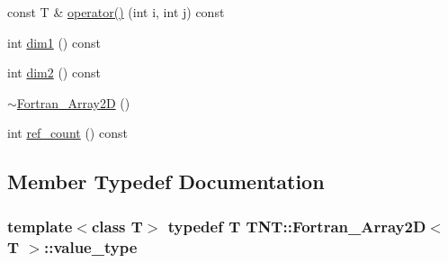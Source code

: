 \begin{DoxyCompactItemize}
const T \& \hyperlink{classTNT_1_1Fortran__Array2D_a96a4dc4f34fc0110b174c440920d454a}{operator()} (int i, int j) const 
\item 
int \hyperlink{classTNT_1_1Fortran__Array2D_aaf13a68efc992804b370571c06c2e96a}{dim1} () const 
\item 
int \hyperlink{classTNT_1_1Fortran__Array2D_aae78024da946d6ac929837625d5a9c5c}{dim2} () const 
\item 
\hyperlink{classTNT_1_1Fortran__Array2D_a8a687f53f3ceab1579d00d372402e9b0}{$\sim$\-Fortran\-\_\-\-Array2\-D} ()
\item 
int \hyperlink{classTNT_1_1Fortran__Array2D_ab735498aca54cf0724ee1ccfe6b11dcf}{ref\-\_\-count} () const 
\end{DoxyCompactItemize}


\subsection{Member Typedef Documentation}
\hypertarget{classTNT_1_1Fortran__Array2D_a498268efd59880dbd352e67e283ea042}{
\subsubsection[{value\-\_\-type}]{\setlength{\rightskip}{0pt plus 5cm}template$<$class T$>$ typedef T {\bf T\-N\-T\-::\-Fortran\-\_\-\-Array2\-D}$<$ T $>$\-::{\bf value\-\_\-type}}}\label{classTNT_1_1Fortran__Array2D_a498268efd59880dbd352e67e283ea042}


